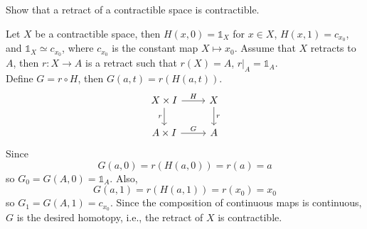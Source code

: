 \setcounter{question}{8}
\question Show that a retract of a contractible space is contractible.


\begin{solution}
%
Let $X$ be a contractible space, then $H(x, 0) = \mathbb{1}_X$ for $x \in X$,
$H(x,1) = c_{x_0}$, and $\mathbb{1}_X \simeq c_{x_0}$, where $c_{x_0}$ is the
constant map $X \mapsto x_0$. Assume that $X$ retracts to $A$, then $r: X
\rightarrow A$ is a retract such that $r(X) = A$, $r\rvert_A = \mathbb{1}_A$.
\\[1ex]
%
Define $G = r \circ H$, then $G(a, t) = r(H(a,t))$.
\[ \begin{tikzcd}
X \times I \arrow{r}{H} \arrow[swap]{d}{r} & X \arrow{d}{r} \\%
A \times I \arrow{r}{G} & A
\end{tikzcd}
\] Since \[ G(a,0) = r(H(a,0)) = r(a) = a \] so $G_0 = G(A, 0) = \mathbb{1}_A$.
Also, \[ G(a,1) = r(H(a,1)) = r(x_0) = x_0 \] so $G_1 = G(A,1) = c_{x_0}$. Since
the composition of continuous maps is continuous, $G$ is the desired homotopy,
i.e., the retract of $X$ is contractible.
\end{solution}